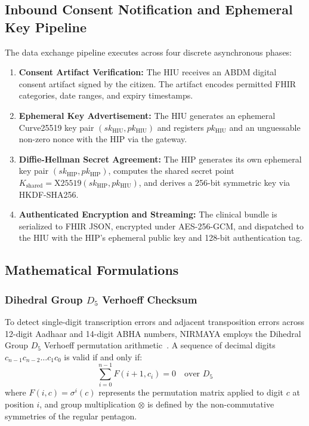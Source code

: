 \documentclass[journal,twocolumn]{IEEEtran}
\begin{document}
\subsection{Inbound Consent Notification and Ephemeral Key Pipeline}
The data exchange pipeline executes across four discrete asynchronous phases:
\begin{enumerate}
    \item \textbf{Consent Artifact Verification:} The HIU receives an ABDM digital consent artifact signed by the citizen. The artifact encodes permitted FHIR categories, date ranges, and expiry timestamps.
    \item \textbf{Ephemeral Key Advertisement:} The HIU generates an ephemeral Curve25519 key pair $(sk_{\text{HIU}}, pk_{\text{HIU}})$ and registers $pk_{\text{HIU}}$ and an unguessable non-zero nonce with the HIP via the gateway.
    \item \textbf{Diffie-Hellman Secret Agreement:} The HIP generates its own ephemeral key pair $(sk_{\text{HIP}}, pk_{\text{HIP}})$, computes the shared secret point $K_{\text{shared}} = \text{X25519}(sk_{\text{HIP}}, pk_{\text{HIU}})$, and derives a 256-bit symmetric key via HKDF-SHA256.
    \item \textbf{Authenticated Encryption and Streaming:} The clinical bundle is serialized to FHIR JSON, encrypted under AES-256-GCM, and dispatched to the HIU with the HIP's ephemeral public key and 128-bit authentication tag.
\end{enumerate}

\subsection{Mathematical Formulations}

\subsubsection{Dihedral Group $D_5$ Verhoeff Checksum}
To detect single-digit transcription errors and adjacent transposition errors across 12-digit Aadhaar and 14-digit ABHA numbers, NIRMAYA employs the Dihedral Group $D_5$ Verhoeff permutation arithmetic~\cite{verhoeff_checksum}. A sequence of decimal digits $c_{n-1} c_{n-2} \dots c_1 c_0$ is valid if and only if:
\begin{equation}
    \sum_{i=0}^{n-1} F(i+1, c_i) = 0 \quad \text{over } D_5
\end{equation}
where $F(i, c) = \sigma^i(c)$ represents the permutation matrix applied to digit $c$ at position $i$, and group multiplication $\otimes$ is defined by the non-commutative symmetries of the regular pentagon.
\end{document}
